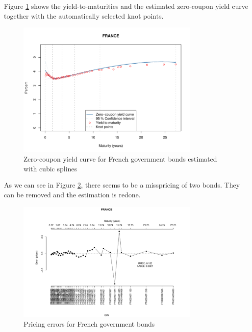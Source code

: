 
Figure \ref{fig:frenchspotcurve} shows the yield-to-maturities and the estimated zero-coupon yield curve together with the automatically selected knot points.

\begin{figure}[htb]
\centering
\caption{Zero-coupon yield curve for French government bonds estimated with cubic splines}
\label{fig:frenchspotcurve}
\includegraphics[width=0.8\textwidth]{fig_frenchspotcurve}
\end{figure}



As we can see in Figure \ref{fig:pricingerrors}, there seems to be a misspricing of two bonds. They can be removed and the estimation is redone.

\begin{figure}[htb]
\centering  
\caption{Pricing errors for French government bonds} 
\label{fig:pricingerrors}
\includegraphics[width=0.8\textwidth]{fig_pricingerrors}
\end{figure}

